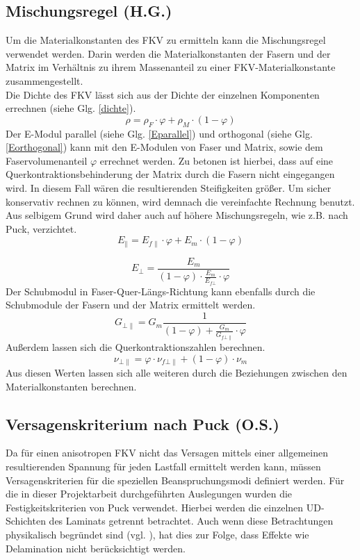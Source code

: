 \subsection{Mischungsregel (H.G.)}
Um die Materialkonstanten des FKV zu ermitteln kann die Mischungsregel verwendet werden. Darin werden die Materialkonstanten der Fasern und der Matrix im Verhältnis zu ihrem Massenanteil zu einer FKV-Materialkonstante zusammengestellt.\\
\noindent
Die Dichte des FKV lässt sich aus der Dichte der einzelnen Komponenten errechnen (siehe Glg. \ref{dichte}).
\begin{equation}
\label{dichte}
	\rho=\rho_{F}\cdot\varphi +\rho_{M}\cdot (1-\varphi)
\end{equation}
\noindent
Der E-Modul parallel (siehe Glg. \ref{Eparallel}) und orthogonal (siehe Glg. \ref{Eorthogonal}) kann mit den E-Modulen von Faser und Matrix, sowie dem Faservolumenanteil $\varphi$ errechnet werden. Zu betonen ist hierbei, dass auf eine Querkontraktionsbehinderung der Matrix durch die Fasern nicht eingegangen wird. In diesem Fall wären die resultierenden Steifigkeiten größer. Um sicher konservativ rechnen zu können, wird demnach die vereinfachte Rechnung benutzt. Aus selbigem Grund wird daher auch auf höhere Mischungsregeln, wie z.B. nach Puck, verzichtet. 
\begin{equation}
\label{Eparallel}
E_{\|}=E_{f\|}\cdot \varphi+E_{m}\cdot (1-\varphi)
\end{equation}

\begin{equation}
\label{Eorthogonal}
E_{\bot}=\frac{E_{m}}{(1-\varphi)\cdot\frac{E_{m}}{E_{f\bot}}\cdot\varphi}
\end{equation}
\noindent
Der Schubmodul in Faser-Quer-Längs-Richtung kann ebenfalls durch die Schubmodule der Fasern und der Matrix ermittelt werden.
\begin{equation}
G_{\bot\|}=G_{m}\frac{1}{(1-\varphi)+\frac{G_{m}}{G_{f\bot\|}}\cdot\varphi}
\end{equation}
Außerdem lassen sich die Querkontraktionszahlen berechnen.
\begin{equation}
\nu_{\bot\|}=\varphi\cdot \nu_{f\bot\|}+(1-\varphi)\cdot \nu_{m}
\end{equation}
Aus diesen Werten lassen sich alle weiteren durch die Beziehungen zwischen den Materialkonstanten berechnen.\cite{item3}

\subsection{Versagenskriterium nach Puck (O.S.)}
Da für einen anisotropen FKV nicht das Versagen mittels einer allgemeinen resultierenden Spannung für jeden Lastfall ermittelt werden kann, müssen Versagenskriterien für die speziellen Beanspruchungsmodi definiert werden. Für die in dieser Projektarbeit durchgeführten Auslegungen wurden die Festigkeitskriterien von Puck verwendet. Hierbei werden die einzelnen UD-Schichten des Laminats getrennt betrachtet. Auch wenn diese Betrachtungen physikalisch begründet sind (vgl. \cite{EdL}), hat dies zur Folge, dass Effekte wie Delamination nicht berücksichtigt werden.
